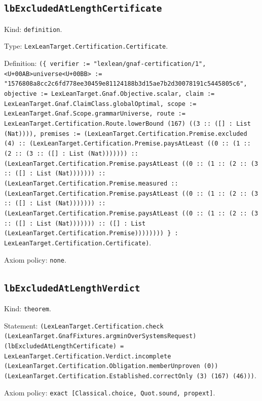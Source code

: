 \documentclass[11pt]{article}
\begin{document}
\subsection*{\texttt{lbExcludedAtLengthCertificate}}
\noindent Kind: \texttt{definition}.\par
\noindent Type: \texttt{LexLeanTarget.Certification.Certificate}.\par
\noindent Definition: \texttt{(\{ verifier := "lexlean/gnaf-certification/1", <U+00AB>universe<U+00BB> := "1576808a8cc2c6fd778ee30459e81124188b3d15ae7b2d30078191c5445805c6", objective := LexLeanTarget.Gnaf.Objective.scalar, claim := LexLeanTarget.Gnaf.ClaimClass.globalOptimal, scope := LexLeanTarget.Gnaf.Scope.grammarUniverse, route := LexLeanTarget.Certification.Route.lowerBound (167) ((3 :: ([] : List (Nat)))), premises := (LexLeanTarget.Certification.Premise.excluded (4) :: (LexLeanTarget.Certification.Premise.paysAtLeast ((0 :: (1 :: (2 :: (3 :: ([] : List (Nat))))))) :: (LexLeanTarget.Certification.Premise.paysAtLeast ((0 :: (1 :: (2 :: (3 :: ([] : List (Nat))))))) :: (LexLeanTarget.Certification.Premise.measured :: (LexLeanTarget.Certification.Premise.paysAtLeast ((0 :: (1 :: (2 :: (3 :: ([] : List (Nat))))))) :: (LexLeanTarget.Certification.Premise.paysAtLeast ((0 :: (1 :: (2 :: (3 :: ([] : List (Nat))))))) :: ([] : List (LexLeanTarget.Certification.Premise)))))))) \} : LexLeanTarget.Certification.Certificate)}.\par
\noindent Axiom policy: \texttt{none}.\par
\subsection*{\texttt{lbExcludedAtLengthVerdict}}
\noindent Kind: \texttt{theorem}.\par
\noindent Statement: \texttt{(LexLeanTarget.Certification.check (LexLeanTarget.GnafFixtures.argminOverSystemsRequest) (lbExcludedAtLengthCertificate) = LexLeanTarget.Certification.Verdict.incomplete (LexLeanTarget.Certification.Obligation.memberUnproven (0)) (LexLeanTarget.Certification.Established.correctOnly (3) (167) (46)))}.\par
\noindent Axiom policy: \texttt{exact [Classical.choice, Quot.sound, propext]}.\par
\end{document}
